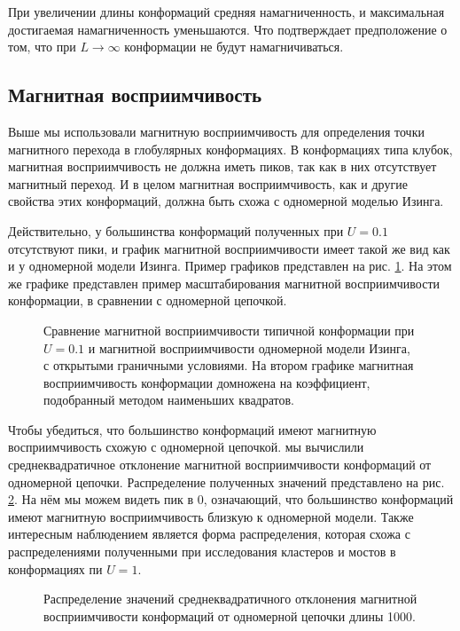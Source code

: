 При увеличении длины конформаций средняя намагниченность, и максимальная достигаемая намагниченность уменьшаются. Что подтверждает предположение о том, что при $L\to \infty$ конформации не будут намагничиваться.


\subsection{Магнитная восприимчивость}
Выше мы использовали магнитную восприимчивость для определения точки магнитного перехода в глобулярных конформациях. В конформациях типа клубок, магнитная восприимчивость не должна иметь пиков, так как в них отсутствует магнитный переход. И в целом магнитная восприимчивость, как и другие свойства этих конформаций, должна быть схожа с одномерной моделью Изинга.

Действительно, у большинства конформаций полученных при $U=0.1$ отсутствуют пики, и график магнитной восприимчивости имеет такой же вид как и у одномерной модели Изинга. Пример графиков представлен на рис. \ref{fig:MS_1D_comparison}. На этом же графике представлен пример масштабирования магнитной восприимчивости конформации, в сравнении с одномерной цепочкой.

\begin{figure}[ht]
	\centering
	
	\caption{Сравнение магнитной восприимчивости типичной конформации при $U=0.1$ и магнитной восприимчивости одномерной модели Изинга, с открытыми граничными условиями. На втором графике магнитная восприимчивость конформации домножена на коэффициент, подобранный методом наименьших квадратов.}
	\label{fig:MS_1D_comparison}
\end{figure}


Чтобы убедиться, что большинство конформаций имеют магнитную восприимчивость схожую с одномерной цепочкой. мы вычислили среднеквадратичное отклонение магнитной восприимчивости конформаций от одномерной цепочки. Распределение полученных значений представлено на рис. \ref{fig:MS_1D_dif_distr}. На нём мы можем видеть пик в 0, означающий, что большинство конформаций имеют магнитную восприимчивость близкую к одномерной модели. Также интересным наблюдением является форма распределения, которая схожа с распределениями полученными при исследования кластеров и мостов в конформациях пи $U=1$.

\begin{figure}[ht]
	\centering
	
	\caption{Распределение значений среднеквадратичного отклонения магнитной восприимчивости конформаций от одномерной цепочки длины 1000.}
	\label{fig:MS_1D_dif_distr}
\end{figure}

